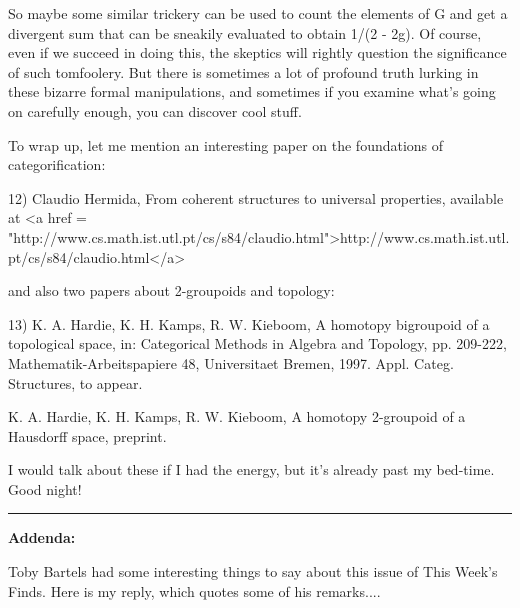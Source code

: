 So maybe some similar trickery can be used to count the elements
of G and get a divergent sum that can be sneakily evaluated to 
obtain 1/(2 - 2g).  Of course, even if we succeed in doing this,
the skeptics will rightly question the significance of such tomfoolery.
But there is sometimes a lot of profound truth lurking in these 
bizarre formal manipulations, and sometimes if you examine what's 
going on carefully enough, you can discover cool stuff.

To wrap up, let me mention an interesting paper on the foundations
of categorification:

12) Claudio Hermida, From coherent structures to universal properties,
available at <a href = "http://www.cs.math.ist.utl.pt/cs/s84/claudio.html">http://www.cs.math.ist.utl.pt/cs/s84/claudio.html</a>

and also two papers about 2-groupoids and topology:

13) K. A. Hardie, K. H. Kamps, R. W. Kieboom, A homotopy bigroupoid of a
topological space, in: Categorical Methods in Algebra and Topology, pp.
209-222, Mathematik-Arbeitspapiere 48, Universitaet Bremen, 1997.   Appl.
Categ. Structures, to appear.

K. A. Hardie, K. H. Kamps, R. W. Kieboom, A homotopy 2-groupoid of a Hausdorff
space, preprint.

I would talk about these if I had the energy, but it's already past
my bed-time.  Good night!


\par\noindent\rule{\textwidth}{0.4pt}

\textbf{Addenda:}

Toby Bartels had some interesting things to say about this issue
of This Week's Finds.  Here is my reply, which quotes some of his
remarks.... 

